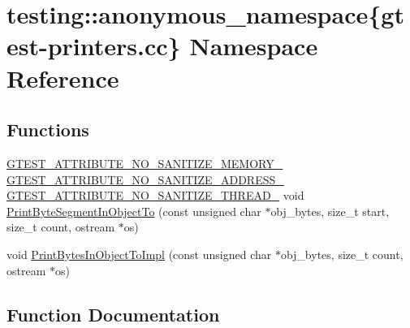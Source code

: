\hypertarget{namespacetesting_1_1anonymous__namespace_02gtest-printers_8cc_03}{}\section{testing\+:\+:anonymous\+\_\+namespace\{gtest-\/printers.cc\} Namespace Reference}
\label{namespacetesting_1_1anonymous__namespace_02gtest-printers_8cc_03}
\subsection*{Functions}
\begin{DoxyCompactItemize}
\item 
\hyperlink{gtest-port_8h_a2a83dd79037e53814a509cc3f5702650}{G\+T\+E\+S\+T\+\_\+\+A\+T\+T\+R\+I\+B\+U\+T\+E\+\_\+\+N\+O\+\_\+\+S\+A\+N\+I\+T\+I\+Z\+E\+\_\+\+M\+E\+M\+O\+R\+Y\+\_\+} \hyperlink{gtest-port_8h_af18b465f4ba6e36eea7a8d2d79521873}{G\+T\+E\+S\+T\+\_\+\+A\+T\+T\+R\+I\+B\+U\+T\+E\+\_\+\+N\+O\+\_\+\+S\+A\+N\+I\+T\+I\+Z\+E\+\_\+\+A\+D\+D\+R\+E\+S\+S\+\_\+} \hyperlink{gtest-port_8h_abf30a6b1b3a12ecb2cc1bc1a6f5f9646}{G\+T\+E\+S\+T\+\_\+\+A\+T\+T\+R\+I\+B\+U\+T\+E\+\_\+\+N\+O\+\_\+\+S\+A\+N\+I\+T\+I\+Z\+E\+\_\+\+T\+H\+R\+E\+A\+D\+\_\+} void \hyperlink{namespacetesting_1_1anonymous__namespace_02gtest-printers_8cc_03_ad297ce40861f170a8269e26a7df2b826}{Print\+Byte\+Segment\+In\+Object\+To} (const unsigned char $\ast$obj\+\_\+bytes, size\+\_\+t start, size\+\_\+t count, ostream $\ast$os)
\item 
void \hyperlink{namespacetesting_1_1anonymous__namespace_02gtest-printers_8cc_03_a7c3551691f3b4ab868eb5b8ceba41bde}{Print\+Bytes\+In\+Object\+To\+Impl} (const unsigned char $\ast$obj\+\_\+bytes, size\+\_\+t count, ostream $\ast$os)
\end{DoxyCompactItemize}


\subsection{Function Documentation}
\mbox{\label{namespacetesting_1_1anonymous__namespace_02gtest-printers_8cc_03_ad297ce40861f170a8269e26a7df2b826}} 

